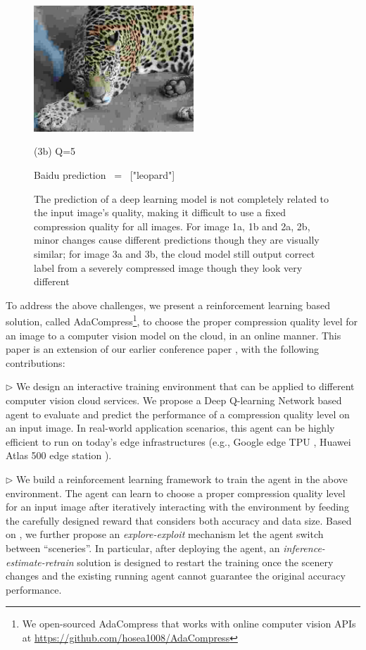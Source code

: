 \begin{figure}[htbp]
\begin{minipage}{0.5\linewidth}
		\centerline{\includegraphics[width=6.0cm, trim=0 0 0 0, clip]{figures/tiger_lowq.jpeg}}
		\centerline{(3b) Q=5}
		\centerline{Baidu prediction \ = \ ["leopard"]}
		\vspace{0.3cm}
	\end{minipage}
	\caption{The prediction of a deep learning model is not completely related to the input image's quality, making it difficult to use a fixed compression quality for all images. For image 1a, 1b and 2a, 2b, minor changes cause different predictions though they are visually similar; for image 3a and 3b, the cloud model still output correct label from a severely compressed image though they look very different}
	\label{fig: compress_accuracy}
\end{figure}

To address the above challenges, we present a reinforcement learning based solution, called AdaCompress\footnote{We open-sourced AdaCompress that works with online computer vision APIs at \url{https://github.com/hosea1008/AdaCompress}}, to choose the proper compression quality level for an image to a computer vision model on the cloud, in an online manner. This paper is an extension of our earlier conference paper \cite{2019adacompress}, with the following contributions:

$\rhd$ We design an interactive training environment that can be applied to different computer vision cloud services. We propose a Deep Q-learning Network based agent to evaluate and predict the performance of a compression quality level on an input image. In real-world application scenarios, this agent can be highly efficient to run on today's edge infrastructures (e.g., Google edge TPU \cite{google-tpu}, Huawei Atlas 500 edge station \cite{huawei-atlas500}).
	
$\rhd$ We build a reinforcement learning framework to train the agent in the above environment. The agent can learn to choose a proper compression quality level for an input image after iteratively interacting with the environment by feeding the carefully designed reward that considers both accuracy and data size. Based on \cite{2019adacompress}, we further propose an \emph{explore-exploit} mechanism let the agent switch between ``sceneries''. In particular, after deploying the agent, an \emph{inference-estimate-retrain} solution is designed to restart the training once the scenery changes and the existing running agent cannot guarantee the original accuracy performance.
	
